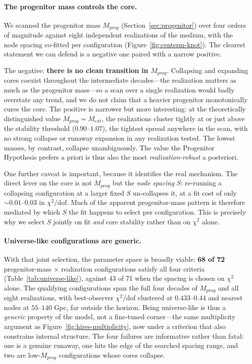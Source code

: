 \documentclass{article}
\begin{document}
\paragraph{The progenitor mass controls the core.}
We scanned the progenitor mass $M_{prog}$ (Section~\ref{sec:progenitor}) over four orders of magnitude against eight independent realizations of the medium, with the node spacing co-fitted per configuration (Figure~\ref{fig:centerm-knot}). The clearest statement we can defend is a negative one paired with a narrow positive.

The negative: \textbf{there is no clean transition in $M_{prog}$}. Collapsing and expanding cores coexist throughout the intermediate decades---the realization matters as much as the progenitor mass---so a scan over a single realization would badly overstate any trend, and we do not claim that a heavier progenitor monotonically cures the core. The positive is narrower but more interesting: at the theoretically distinguished value $M_{prog}=M_{ext}$, the realizations cluster tightly at or just above the stability threshold ($0.90$--$1.07$), the tightest spread anywhere in the scan, with no strong collapse or runaway expansion in any realization tested. The lowest masses, by contrast, collapse unambiguously. The value the Progenitor Hypothesis prefers a priori is thus also the most \emph{realization-robust} a posteriori.

One further caveat is important, because it identifies the real mechanism. The direct lever on the core is not $M_{prog}$ but the \emph{node spacing} $S$: re-running a collapsing configuration at a larger fixed $S$ un-collapses it, at a fit cost of only $\sim0.01$--$0.03$ in $\chi^2/\mathrm{dof}$. Much of the apparent progenitor-mass pattern is therefore mediated by which $S$ the fit happens to select per configuration. This is precisely why we select $S$ jointly on fit \emph{and} core stability rather than on $\chi^2$ alone.

\paragraph{Universe-like configurations are generic.}
With that joint selection, the parameter space is broadly viable: \textbf{68 of 72} progenitor-mass $\times$ realization configurations satisfy all four criteria (Table~\ref{tab:universe-like}), against 43 of 71 when the spacing is chosen on $\chi^2$ alone. The qualifying configurations span the full four decades of $M_{prog}$ and all eight realizations, with best-observer $\chi^2/\mathrm{dof}$ clustered at $0.433$--$0.44$ and nearest nodes at $55$--$140$ Gpc, far outside the horizon. Being universe-like is thus a \emph{generic} property of the model, not a fine-tuned corner---the same multiplicity argument as Figure~\ref{fig:hires-multiplicity}, now under a criterion that also constrains internal structure. The four failures are informative rather than fatal: one is a genuine runaway, one hits the edge of the searched spacing range, and two are low-$M_{prog}$ configurations whose cores collapse.
\end{document}

